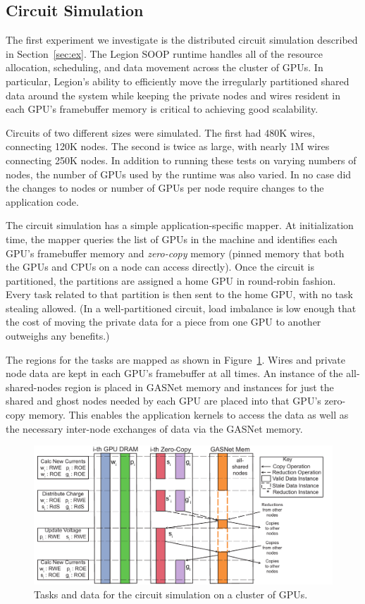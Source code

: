 \subsection{Circuit Simulation}
\label{subsec:exp_ckt}

The first experiment we investigate is the distributed circuit simulation described in 
Section~\ref{sec:ex}.  The Legion SOOP runtime handles all of the resource allocation, 
scheduling, and data movement across the cluster of GPUs.  In particular,  
Legion's ability to efficiently move the irregularly partitioned
shared data around the system while keeping the private nodes and wires resident in
each GPU's framebuffer memory is critical to achieving good scalability.

Circuits of two different sizes were simulated.  The first had 480K wires, connecting
120K nodes.  The second is twice as large, with nearly 1M wires connecting 
250K nodes.  In addition to running these tests on varying numbers of
nodes, the number of GPUs used by the runtime was also varied.  In no case did the 
changes to nodes or number of GPUs per node require changes to the application code.

The circuit simulation has a simple application-specific mapper.  At initialization
time, the mapper queries the list of GPUs in the machine and identifies each GPU's
framebuffer memory and {\em zero-copy} memory (pinned memory that both the GPUs and
CPUs on a node can access directly).  Once the circuit is partitioned, the partitions
are assigned a home GPU in round-robin fashion.  Every task related to that partition is
then sent to the home GPU, with no task stealing allowed.  
(In a well-partitioned circuit,
load imbalance is low enough that the cost of moving the private data for a piece from one
GPU to another outweighs any benefits.)

  The regions for the tasks are mapped as 
shown in Figure~\ref{fig:gpumapping}.  Wires and private node data are kept in each GPU's
framebuffer at all times.  An instance of the all-shared-nodes region is placed in
GASNet memory and instances for just the shared and ghost nodes needed by each GPU
are placed into that GPU's zero-copy memory.  This enables the application kernels
to access the data as well as the necessary inter-node exchanges of data via the GASNet
memory.

\begin{figure}
\includegraphics[scale=0.48]{figs/CircuitMem.pdf}
\caption{Tasks and data for the circuit simulation on a cluster of GPUs.}
\label{fig:gpumapping}
\end{figure}

